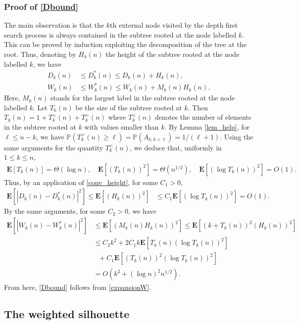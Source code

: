 \documentclass{amsart}       %
\newcommand{\E}[1]{\ensuremath{\mathbf{E} \left[#1 \right]}}
\newcommand{\Prob}[1]{\ensuremath{\mathbb{P} \left(#1 \right)}}
\begin{document}
\subsubsection{Proof of \eqref{Dbound}}
The main observation is that the $k$th external node visited by the depth first search process is always contained in the subtree rooted at the node labelled $k$.
This can be proved by induction exploiting the decomposition of the tree at the root. Thus, denoting by $H_k(n)$ the height of the subtree rooted at the node labelled $k$, we have
\begin{align*}
D_k(n) & \leq D_k^*(n) \leq D_k(n) + H_k(n), \\
W_k(n) & \leq W_k^*(n) \leq W_k(n) + M_k(n) H_k(n).
\end{align*}
Here, $M_k(n)$ stands for the largest label in the subtree rooted at the node labelled $k$. Let $T_k(n)$ be the size of the subtree rooted at $k$. Then $T_k(n) = 1 + T^{<}_k(n) + T^{>}_k(n)$ where $T^{<}_k(n)$ denotes the number of elements in the subtree rooted at $k$
with values smaller than $k$. By Lemma \ref{lem_help}, for $\ell \leq n - k$, we have $\Prob{T^{>}_k(n) \geq \ell} = \Prob{A_{k,k+\ell}} = 1/(\ell+1)$. Using the same arguments for the quantity $T^{<}_k(n)$, we deduce that,  uniformly in $1 \leq k \leq n$,
\begin{align*}
\E{T_k(n)} = \Theta(\log n), \quad \E{(T_k(n))^2} = \Theta(n^{1/2}), \quad \E{(\log T_k(n))^2} = O(1).
\end{align*}
Thus, by an application of \eqref{conv_height}, for some $C_1 > 0$,
\begin{align*}
\E{|D_k(n) - D_k^*(n)|^2} \leq \E{(H_k(n))^2} & \leq C_1 \E{(\log T_k(n))^2} =  O(1). 
\end{align*}
 By the same arguments,  for some $C_2 > 0$, we have
\begin{align*}
\E{|W_k(n) - W_k^*(n)|^2} & \leq \E{(M_k(n) H_k(n))^2} \leq \E{(k + T_k(n))^2 (H_k(n))^2} \\
& \leq C_2 k^2 + 2 C_1 k \E{T_k(n) (\log T_k(n))^2}  \\ 
 & \, \,  \,  \,+ C_1 \E{(T_k(n))^2 (\log T_k(n))^2}  \\
& = O(k^2 +  (\log n)^{2} n^{1/2}).
\end{align*}
From here, \eqref{Dbound} follows from \eqref{expansionW}.
\subsection{The weighted silhouette} \label{sec:binary} \hfill \\
\end{document}
